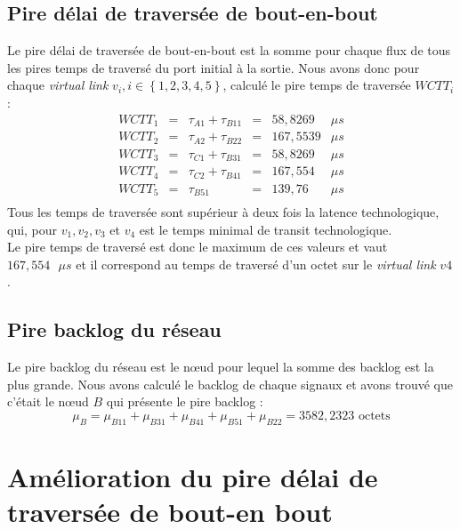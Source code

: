 \subsection{Pire délai de traversée de bout-en-bout}
Le pire délai de traversée de bout-en-bout est la somme pour chaque flux de tous les pires temps de traversé du port initial à la sortie.
Nous avons donc pour chaque \emph{virtual link} $v_i, i \in \left\lbrace 1,2,3,4,5\right\rbrace$, calculé le pire temps de traversée $WCTT_i$ :
\begin{equation}
\begin{array}{lclcll}
WCTT_1	&=&	\tau_{A1} + \tau_{B11} 	&=& 58,8269&\mu s\\
WCTT_2	&=&	\tau_{A2} + \tau_{B22} 	&=& 167,5539&\mu s\\
WCTT_3	&=&	\tau_{C1} + \tau_{B31} 	&=& 58,8269	&\mu s\\
WCTT_4	&=&	\tau_{C2} + \tau_{B41} 	&=& 167,554	&\mu s\\
WCTT_5	&=&	\tau_{B51} 				&=& 139,76	&\mu s\\
\end{array}
\end{equation}
Tous les temps de traversée sont supérieur à deux fois la latence technologique, qui, pour $v_1, v_2, v_3$ et $v_4$ est le temps minimal de transit technologique.\\

Le pire temps de traversé est donc le maximum de ces valeurs et vaut $167,554 \text{ }\mu s$ et il correspond au temps de traversé d'un octet sur le \emph{virtual link} $v4$.
\subsection{Pire backlog du réseau}
Le pire backlog du réseau est le nœud pour lequel la somme des backlog est la plus grande.
Nous avons calculé le backlog de chaque signaux et avons trouvé que c'était le nœud $B$ qui présente le pire backlog : 
\begin{equation}
\mu_B = \mu_{B11} + \mu_{B31} + \mu_{B41} + \mu_{B51} + \mu_{B22}  = 3582,2323 \text{ octets}
\end{equation}
\section{Amélioration du pire délai de traversée de bout-en bout}
